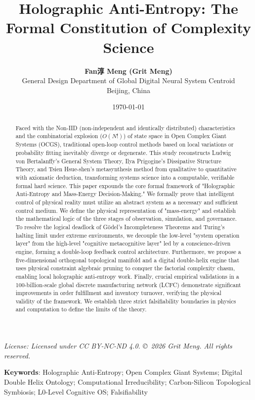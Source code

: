 \documentclass[11pt,a4paper]{article}
\title{\textbf{Holographic Anti-Entropy: The Formal Constitution of Complexity Science}}
\author{\textbf{Fan淳 Meng (Grit Meng)}\\[2pt] 
\small General Design Department of Global Digital Neural System Centroid \\ 
\small Beijing, China}
\date{\today}
\begin{document}
\maketitle

\begin{center}
\small\itshape
License: Licensed under CC BY-NC-ND 4.0. \copyright\ 2026 Grit Meng. All rights reserved.
\end{center}
\vspace{1em}

\begin{abstract}
Faced with the Non-IID (non-independent and identically distributed) characteristics and the combinatorial explosion ($O(N!)$) of state space in Open Complex Giant Systems (OCGS), traditional open-loop control methods based on local variations or probability fitting inevitably diverge or degenerate. This study reconstructs Ludwig von Bertalanffy's General System Theory, Ilya Prigogine's Dissipative Structure Theory, and Tsien Hsue-shen's metasynthesis method from qualitative to quantitative with axiomatic deduction, transforming systems science into a computable, verifiable formal hard science. This paper expounds the core formal framework of "Holographic Anti-Entropy and Mass-Energy Decision-Making." We formally prove that intelligent control of physical reality must utilize an abstract system as a necessary and sufficient control medium. We define the physical representation of "mass-energy" and establish the mathematical logic of the three stages of observation, simulation, and governance. To resolve the logical deadlock of G\"odel's Incompleteness Theorems and Turing's halting limit under extreme environments, we decouple the low-level "system operation layer" from the high-level "cognitive metacognitive layer" led by a conscience-driven engine, forming a double-loop feedback control architecture. Furthermore, we propose a five-dimensional orthogonal topological manifold and a digital double-helix engine that uses physical constraint algebraic pruning to conquer the factorial complexity chasm, enabling local holographic anti-entropy work. Finally, crucial empirical validations in a 100-billion-scale global discrete manufacturing network (LCFC) demonstrate significant improvements in order fulfillment and inventory turnover, verifying the physical validity of the framework. We establish three strict falsifiability boundaries in physics and computation to define the limits of the theory.
\end{abstract}

\textbf{Keywords}: Holographic Anti-Entropy; Open Complex Giant Systems; Digital Double Helix Ontology; Computational Irreducibility; Carbon-Silicon Topological Symbiosis; L0-Level Cognitive OS; Falsifiability
\end{document}
